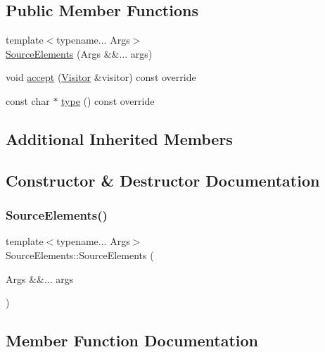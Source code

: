 \subsection*{Public Member Functions}
\begin{DoxyCompactItemize}
\item 
{\footnotesize template$<$typename... Args$>$ }\\\hyperlink{struct_source_elements_a1f7065c95d241407e691f198c8dd9b19}{Source\+Elements} (Args \&\&... args)
\item 
void \hyperlink{struct_source_elements_af5c2f1b3c9a9961f4d76734953a4fdf5}{accept} (\hyperlink{struct_visitor}{Visitor} \&visitor) const override
\item 
const char $\ast$ \hyperlink{struct_source_elements_a2e6131a995ee5d7e0c8e7a440827245d}{type} () const override
\end{DoxyCompactItemize}
\subsection*{Additional Inherited Members}


\subsection{Constructor \& Destructor Documentation}
\mbox{\label{struct_source_elements_a1f7065c95d241407e691f198c8dd9b19}} 
\subsubsection{\texorpdfstring{Source\+Elements()}{SourceElements()}}
{\footnotesize\ttfamily template$<$typename... Args$>$ \\
Source\+Elements\+::\+Source\+Elements (\begin{DoxyParamCaption}\item[{Args \&\&...}]{args }\end{DoxyParamCaption})\hspace{0.3cm}{\ttfamily [inline]}}



\subsection{Member Function Documentation}
\mbox{\label{struct_source_elements_af5c2f1b3c9a9961f4d76734953a4fdf5}} 
